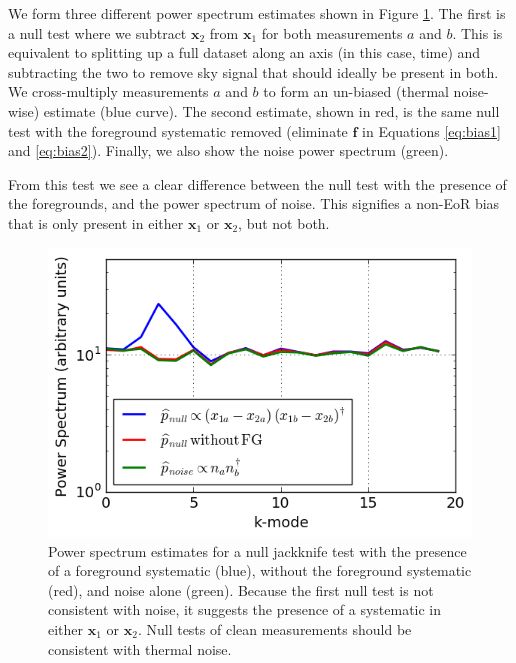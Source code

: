 \documentclass[preprint2,numberedappendix,tighten]{aastex6}  %
\begin{document}
We form three different power spectrum estimates shown in Figure \ref{fig:toy_bias1}. The first is a null test where we subtract $
\textbf{x}_{2}$ from $\textbf{x}_{1}$ for both measurements $a$ and $b$. This is equivalent to splitting up a full dataset along 
an axis (in this case, time) and subtracting the two to remove sky signal that should ideally be present in both. We cross-multiply measurements $a$ and $b$ to form an un-biased (thermal noise-wise) estimate (blue curve). The second estimate, 
shown in red, is the same null test with the foreground systematic removed (eliminate $\textbf{f}$ in Equations \ref{eq:bias1} 
and \ref{eq:bias2}). Finally, we also show the noise power spectrum (green).

From this test we see a clear difference between the null test with the presence of the foregrounds, and the power spectrum of 
noise. This signifies a non-EoR bias that is only present in either $\textbf{x}_{1}$ or $\textbf{x}_{2}$, but not both.

\begin{figure}
	\centering
	\includegraphics[trim={0cm 0cm 0cm 0cm},width=\columnwidth]{plots/toy_bias1.png}
	\caption{Power spectrum estimates for a null jackknife test with the presence of a foreground systematic (blue), without 
the foreground systematic (red), and noise alone (green). Because the first null test is not consistent with noise, it suggests the 
presence of a systematic in either $\textbf{x}_{1}$ or $\textbf{x}_{2}$. Null tests of clean measurements should be consistent 
with thermal noise.}
	\label{fig:toy_bias1}
\end{figure}
\end{document}

